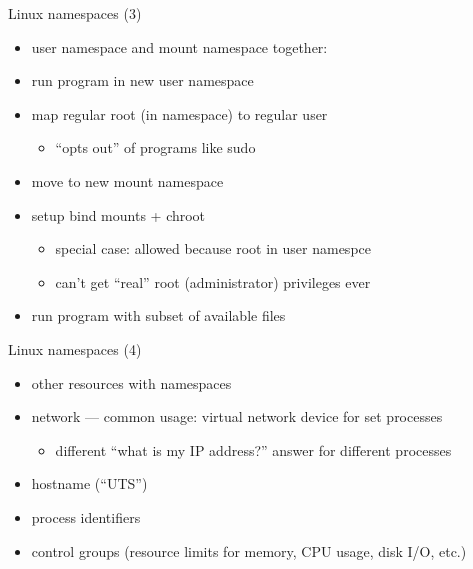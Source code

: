 \begin{frame}{Linux namespaces (3)}
    \begin{itemize}
    \item user namespace and mount namespace together:
    \vspace{.5cm}
    \item run program in new user namespace
    \item map regular root (in namespace) to regular user
        \begin{itemize}
        \item ``opts out'' of programs like sudo
        \end{itemize}
    \item move to new mount namespace
    \item setup bind mounts + chroot
        \begin{itemize}
        \item special case: allowed because root in user namespce
        \item can't get ``real'' root (administrator) privileges ever
        \end{itemize}
    \item run program with subset of available files
    \end{itemize}
\end{frame}

\begin{frame}{Linux namespaces (4)}
    \begin{itemize}
    \item other resources with namespaces
    \item network --- common usage: virtual network device for set processes
        \begin{itemize}
        \item different ``what is my IP address?'' answer for different processes
        \end{itemize}
    \item hostname (``UTS'')
    \item process identifiers
    \item control groups (resource limits for memory, CPU usage, disk I/O, etc.)
    \end{itemize}
\end{frame}

